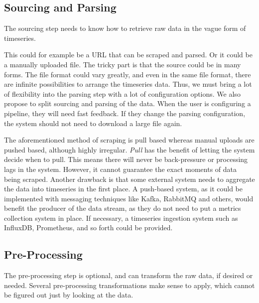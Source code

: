 \subsection{Sourcing and Parsing}

The sourcing step needs to know how to retrieve raw data in the vague form of timeseries. 

This could for example be a URL that can be scraped and parsed. Or it could be a manually uploaded file. The tricky part is that the source could be in many forms. The file format could vary greatly, and even in the same file format, there are infinite possibilities to arrange the timeseries data. Thus, we must bring a lot of flexibility into the parsing step with a lot of configuration options. We also propose to split sourcing and parsing of the data. When the user is configuring a pipeline, they will need fast feedback. If they change the parsing configuration, the system should not need to download a large file again.

The aforementioned method of scraping is pull based whereas manual uploads are pushed based, although highly irregular. \emph{Pull} has the benefit of letting the system decide when to pull. This means there will never be back-pressure or processing lags in the system. However, it cannot guarantee the exact moments of data being scraped. Another drawback is that some external system needs to aggregate the data into timeseries in the first place. A push-based system, as it could be implemented with messaging techniques like Kafka, RabbitMQ and others, would benefit the producer of the data stream, as they do not need to put a metrics collection system in place. If necessary, a timeseries ingestion system such as InfluxDB, Prometheus, and so forth could be provided.

\subsection{Pre-Processing}

The pre-processing step is optional, and can transform the raw data, if desired or needed. Several pre-processing transformations make sense to apply, which cannot be figured out just by looking at the data.

